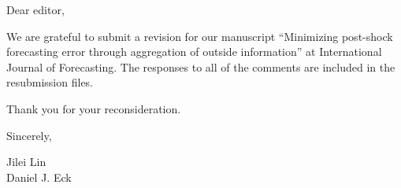 \documentclass[11pt]{article}
\begin{document}
\footnotesize

\normalsize 


Dear editor,

We are grateful to submit a revision for our manuscript ``Minimizing post-shock forecasting error through aggregation of outside information'' at International Journal of Forecasting.  The responses to all of the comments are included in the resubmission files. 

Thank you for your reconsideration.



Sincerely,

Jilei Lin \\
Daniel J. Eck 
\end{document}
